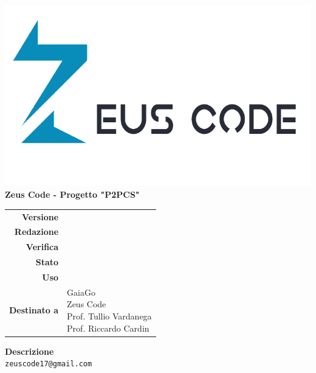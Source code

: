 \thispagestyle{empty}
\begin{titlepage}
	\begin{center}
		\includegraphics[scale = 0.3]{res/images/zeus_code_logo.png}\\
		\large \textbf{Zeus Code - Progetto "P2PCS"} \\
		\vfill
		\Huge \textbf{\doctitle}
		\vspace*{\fill}
		
		\vfill
		\large
		\begin{tabular}{r|l}
			\textbf{Versione} & \rev{} \\
			\textbf{Redazione} & \red{} \\
			\textbf{Verifica} & \ver{} \\
			\textbf{Stato} & \stato{} \\
			\textbf{Uso} & \uso{} \\
			\textbf{Destinato a} & \parbox[t]{5cm}{GaiaGo \\Zeus Code
				\\Prof. Tullio Vardanega\\Prof. Riccardo Cardin}
		\end{tabular}
		\vfill
		\normalsize
		\textbf{Descrizione}\\
		\describedoc
		\vfill
		\small
		\texttt{zeuscode17@gmail.com}
	\end{center}
\end{titlepage}
